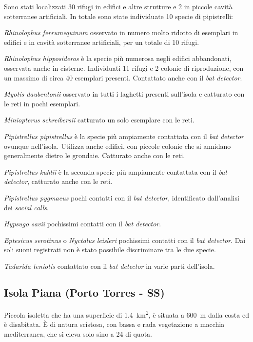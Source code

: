 \begin{multicols}{2}
\begin{compactdesc}
Sono stati localizzati 30 rifugi in edifici e altre strutture e 2 in piccole cavità sotterranee artificiali. 
In totale sono state individuate 10 specie di pipistrelli: 
\begin{compactdesc}
\item[\emph{Rhinolophus ferrumequinum}] osservato in numero molto ridotto di esemplari in edifici e in cavità sotterranee artificiali, per un totale di 10 rifugi.
\item[\emph{Rhinolophus hipposideros}] è la specie più numerosa negli edifici abbandonati, osservata anche in cisterne. Individuati 11 rifugi e 2 colonie di riproduzione, con un massimo di circa 40 esemplari presenti. Contattato anche con il \textit{bat detector}.
\item[\emph{Myotis daubentonii}] osservato in tutti i laghetti presenti sull’isola e catturato con le reti in pochi esemplari. 
\item[\emph{Miniopterus schreibersii}] catturato un solo esemplare con le reti. 
\item[\emph{Pipistrellus pipistrellus}] è la specie più ampiamente contattata con il \textit{bat detector} ovunque nell’isola. Utilizza anche edifici, con piccole colonie che si annidano generalmente dietro le grondaie. Catturato anche con le reti.
\item[\emph{Pipistrellus kuhlii}] è la seconda specie più ampiamente contattata con il \textit{bat detector}, catturato anche con le reti. 
\item[\emph{Pipistrellus pygmaeus}] pochi contatti con il \textit{bat detector}, identificato dall’analisi dei \textit{social calls}. 
\item[\emph{Hypsugo savii}] pochissimi contatti con il \textit{bat detector}. 
\item[\emph{Eptesicus serotinus} o \emph{Nyctalus leisleri}] pochissimi contatti con il \textit{bat detector}. Dai soli suoni registrati non è stato possibile discriminare tra le due specie.
\item[\emph{Tadarida teniotis}] contattato con il \textit{bat detector} in varie parti dell’isola. 
\end{compactdesc}

\subsection*{Isola Piana (Porto Torres - SS)}
Piccola isoletta che ha una superficie di \SI{1.4}{\square\kilo\meter}, è situata a 600~m dalla costa ed è disabitata. È di natura scistosa, con bassa e rada vegetazione a macchia mediterranea, che si eleva solo sino a 24 di quota. 


\end{compactdesc}
\end{multicols}
